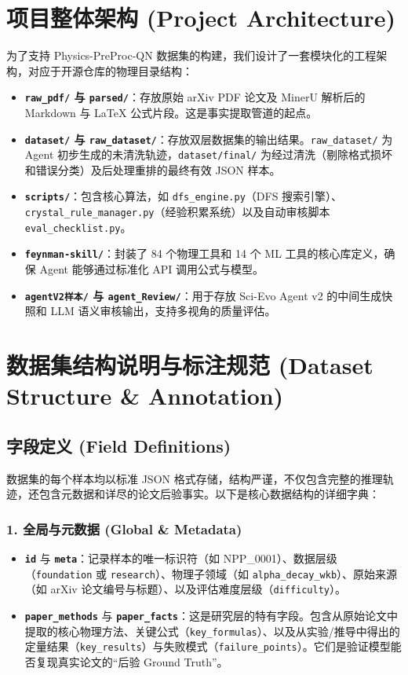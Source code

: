 \documentclass[12pt,a4paper]{article}
\begin{document}
\section{项目整体架构 (Project Architecture)}
为了支持 Physics-PreProc-QN 数据集的构建，我们设计了一套模块化的工程架构，对应于开源仓库的物理目录结构：
\begin{itemize}
\item \textbf{\texttt{raw\_pdf/} 与 \texttt{parsed/}}：存放原始 arXiv PDF 论文及 MinerU 解析后的 Markdown 与 LaTeX 公式片段。这是事实提取管道的起点。
\item \textbf{\texttt{dataset/} 与 \texttt{raw\_dataset/}}：存放双层数据集的输出结果。\texttt{raw\_dataset/} 为 Agent 初步生成的未清洗轨迹，\texttt{dataset/final/} 为经过清洗（剔除格式损坏和错误分类）及后处理重排的最终有效 JSON 样本。
\item \textbf{\texttt{scripts/}}：包含核心算法，如 \texttt{dfs\_engine.py}（DFS 搜索引擎）、\texttt{crystal\_rule\_manager.py}（经验积累系统）以及自动审核脚本 \texttt{eval\_checklist.py}。
\item \textbf{\texttt{feynman-skill/}}：封装了 84 个物理工具和 14 个 ML 工具的核心库定义，确保 Agent 能够通过标准化 API 调用公式与模型。
\item \textbf{\texttt{agentV2样本/} 与 \texttt{agent\_Review/}}：用于存放 Sci-Evo Agent v2 的中间生成快照和 LLM 语义审核输出，支持多视角的质量评估。
\end{itemize}

\section{数据集结构说明与标注规范 (Dataset Structure \& Annotation)}

\subsection{字段定义 (Field Definitions)}
数据集的每个样本均以标准 JSON 格式存储，结构严谨，不仅包含完整的推理轨迹，还包含元数据和详尽的论文后验事实。以下是核心数据结构的详细字典：

\subsubsection{1. 全局与元数据 (Global \& Metadata)}
\begin{itemize}
\item \textbf{\texttt{id}} 与 \textbf{\texttt{meta}}：记录样本的唯一标识符（如 NPP\_0001）、数据层级（\texttt{foundation} 或 \texttt{research}）、物理子领域（如 \texttt{alpha\_decay\_wkb}）、原始来源（如 arXiv 论文编号与标题）、以及评估难度层级（\texttt{difficulty}）。
\item \textbf{\texttt{paper\_methods}} 与 \textbf{\texttt{paper\_facts}}：这是研究层的特有字段。包含从原始论文中提取的核心物理方法、关键公式（\texttt{key\_formulas}）、以及从实验/推导中得出的定量结果（\texttt{key\_results}）与失败模式（\texttt{failure\_points}）。它们是验证模型能否复现真实论文的“后验 Ground Truth”。
\end{itemize}
\end{document}
